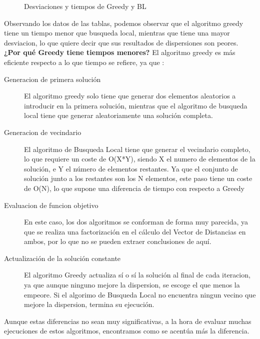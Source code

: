 \documentclass{article}
\begin{document}
\begin{figure}[h]
  \centering
  \caption{Desviaciones y tiempos de Greedy y BL}
\end{figure}

\vspace{10mm}
Observando los datos de las tablas, podemos observar que el algoritmo greedy tiene un 
tiempo menor que busqueda local, mientras que tiene una mayor desviacion, lo que quiere decir 
que sus resultados de dispersiones son peores.
\vspace{10mm}
\newline \textbf{¿Por qué Greedy tiene tiempos menores?}
\newline El algoritmo greedy es más eficiente respecto a lo que tiempo se refiere, 
ya que :
\begin{description}
  \item[Generacion de primera solución]
  El algoritmo greedy solo tiene que generar dos elementos aleatorios a introducir 
  en la primera solución, mientras que el algoritmo de busqueda local tiene que 
  generar aleatoriamente una solución completa.
  \item[Generacion de vecindario]
  El algoritmo de Busqueda Local tiene que generar el vecindario completo, lo que requiere un 
  coste de O(X*Y), siendo X el numero de elementos de la solución, e Y el número de elementos restantes.
  Ya que el conjunto de solución junto a los restantes son los N elementos, este paso tiene un coste 
  de O(N), lo que supone una diferencia de tiempo con respecto a Greedy
  \item[Evaluacion de funcion objetivo]
  En este caso, los dos algoritmos se conforman de forma muy parecida, ya que se realiza 
  una factorización en el cálculo del Vector de Distancias en ambos, por lo que no se pueden 
  extraer conclusiones de aquí.
  \item[Actualización de la solución constante]
  El algoritmo Greedy actualiza sí o sí la solución al final de cada iteracion, ya que 
  aunque ninguno mejore la dispersion, se escoge el que menos la empeore. Si el algorimo de 
  Busqueda Local no encuentra ningun vecino que mejore la dispersion, termina su ejecución.
\end{description}
Aunque estas diferencias no sean muy significativas, a la hora de evaluar muchas ejecuciones 
de estos algoritmos, encontramos como se acentúa más la diferencia.
\vspace{5mm}
\end{document}
